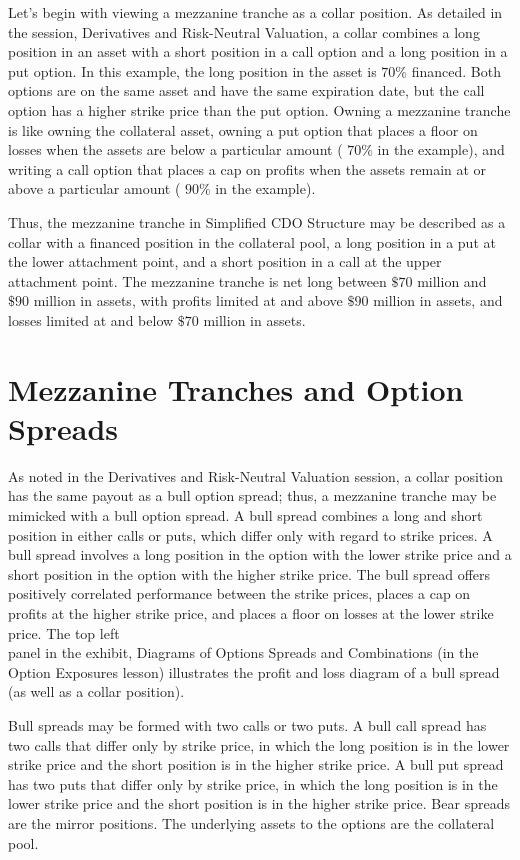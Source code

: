\documentclass[11pt]{article}
\begin{document}
Let's begin with viewing a mezzanine tranche as a collar position. As detailed in the session, Derivatives and Risk-Neutral Valuation, a collar combines a long position in an asset with a short position in a call option and a long position in a put option. In this example, the long position in the asset is $70 \%$ financed. Both options are on the same asset and have the same expiration date, but the call option has a higher strike price than the put option. Owning a mezzanine tranche is like owning the collateral asset, owning a put option that places a floor on losses when the assets are below a particular amount ( $70 \%$ in the example), and writing a call option that places a cap on profits when the assets remain at or above a particular amount ( $90 \%$ in the example).

Thus, the mezzanine tranche in Simplified CDO Structure may be described as a collar with a financed position in the collateral pool, a long position in a put at the lower attachment point, and a short position in a call at the upper attachment point. The mezzanine tranche is net long between $\$ 70$ million and $\$ 90$ million in assets, with profits limited at and above $\$ 90$ million in assets, and losses limited at and below $\$ 70$ million in assets.

\section*{Mezzanine Tranches and Option Spreads}
As noted in the Derivatives and Risk-Neutral Valuation session, a collar position has the same payout as a bull option spread; thus, a mezzanine tranche may be mimicked with a bull option spread. A bull spread combines a long and short position in either calls or puts, which differ only with regard to strike prices. A bull spread involves a long position in the option with the lower strike price and a short position in the option with the higher strike price. The bull spread offers positively correlated performance between the strike prices, places a cap on profits at the higher strike price, and places a floor on losses at the lower strike price. The top left\\
panel in the exhibit, Diagrams of Options Spreads and Combinations (in the Option Exposures lesson) illustrates the profit and loss diagram of a bull spread (as well as a collar position).

Bull spreads may be formed with two calls or two puts. A bull call spread has two calls that differ only by strike price, in which the long position is in the lower strike price and the short position is in the higher strike price. A bull put spread has two puts that differ only by strike price, in which the long position is in the lower strike price and the short position is in the higher strike price. Bear spreads are the mirror positions. The underlying assets to the options are the collateral pool.
\end{document}
